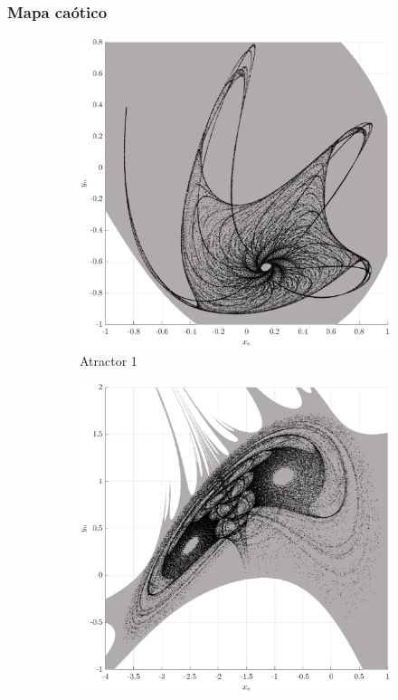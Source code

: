 \documentclass[10pt]{beamer}
\begin{document}
\begin{frame}
    \frametitle{Mapa caótico}
	\begin{figure}[hbtp]
            \centering
            \caption{Diferentes atractores caóticos y dominios de atracción del mapa bidimensional $A_{1}$ y $A_{2}$.} 
            \begin{subfigure}[b]{0.475\textwidth}
                \centering
                \includegraphics[width=\textwidth,trim=70 0 70 0,clip]{H1_map1}
                \caption{Atractor 1}    
                \label{fig:mapa_h1}
            \end{subfigure}
            \hfill
            \begin{subfigure}[b]{0.475\textwidth}  
                \centering 
                \includegraphics[width=\textwidth,trim=70 0 70 0,clip]{H2_map2}

\end{subfigure}
\end{figure}
\end{frame}
\end{document}
